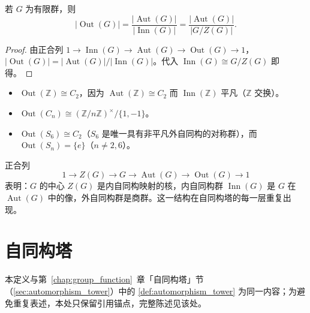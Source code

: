 \begin{property}[外自同构群的阶]\label{prop:outer_automorphism_order}
若 $G$ 为有限群，则
\[
|\operatorname{Out}(G)| = \frac{|\operatorname{Aut}(G)|}{|\operatorname{Inn}(G)|} = \frac{|\operatorname{Aut}(G)|}{|G/Z(G)|}.
\]
\end{property}

\begin{proof}
由正合列 $1\to\operatorname{Inn}(G)\to\operatorname{Aut}(G)\to\operatorname{Out}(G)\to 1$，$|\operatorname{Out}(G)| = |\operatorname{Aut}(G)|/|\operatorname{Inn}(G)|$。代入 $\operatorname{Inn}(G)\cong G/Z(G)$ 即得。
\end{proof}

\begin{example}[外自同构群的典型例子]\label{ex:outer_automorphism_examples}
\begin{itemize}
    \item $\operatorname{Out}(\mathbb{Z}) \cong C_2$，因为 $\operatorname{Aut}(\mathbb{Z})\cong C_2$ 而 $\operatorname{Inn}(\mathbb{Z})$ 平凡（$\mathbb{Z}$ 交换）。
    \item $\operatorname{Out}(C_n) \cong (\mathbb{Z}/n\mathbb{Z})^\times/\{1,-1\}$。
    \item $\operatorname{Out}(S_6) \cong C_2$（$S_6$ 是唯一具有非平凡外自同构的对称群），而 $\operatorname{Out}(S_n)=\{e\}$（$n\neq 2,6$）。
\end{itemize}
\end{example}

\begin{remark}[正合列的含义]\label{rem:exact_sequence_operator}
正合列
\[
1 \to Z(G) \to G \to \operatorname{Aut}(G) \to \operatorname{Out}(G) \to 1
\]
表明：$G$ 的中心 $Z(G)$ 是内自同构映射的核，内自同构群 $\operatorname{Inn}(G)$ 是 $G$ 在 $\operatorname{Aut}(G)$ 中的像，外自同构群是商群。这一结构在自同构塔的每一层重复出现。
\end{remark}

\section{自同构塔}

\begin{definition}[自同构塔]\label{def:higher_automorphism_tower}
本定义与第~\ref{chap:group_function}~章「自同构塔」节（\cref{sec:automorphism_tower}）中的 \cref{def:automorphism_tower} 为同一内容；为避免重复表述，本处只保留引用锚点，完整陈述见该处。
\end{definition}

